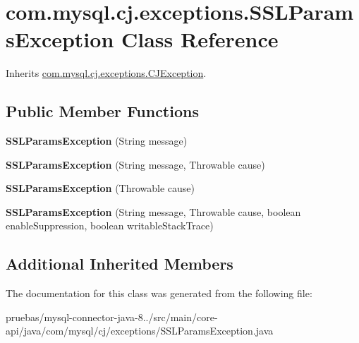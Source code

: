 \hypertarget{classcom_1_1mysql_1_1cj_1_1exceptions_1_1_s_s_l_params_exception}{}\section{com.\+mysql.\+cj.\+exceptions.\+S\+S\+L\+Params\+Exception Class Reference}
\label{classcom_1_1mysql_1_1cj_1_1exceptions_1_1_s_s_l_params_exception}


Inherits \mbox{\hyperlink{classcom_1_1mysql_1_1cj_1_1exceptions_1_1_c_j_exception}{com.\+mysql.\+cj.\+exceptions.\+C\+J\+Exception}}.

\subsection*{Public Member Functions}
\begin{DoxyCompactItemize}
\item 
\mbox{\label{classcom_1_1mysql_1_1cj_1_1exceptions_1_1_s_s_l_params_exception_a752de2699be84a20ae7aa974f57611b7}} 
{\bfseries S\+S\+L\+Params\+Exception} (String message)
\item 
\mbox{\label{classcom_1_1mysql_1_1cj_1_1exceptions_1_1_s_s_l_params_exception_aa0c6ca68d7e7fd39b7c4d849550d70b5}} 
{\bfseries S\+S\+L\+Params\+Exception} (String message, Throwable cause)
\item 
\mbox{\label{classcom_1_1mysql_1_1cj_1_1exceptions_1_1_s_s_l_params_exception_a5ae440bf6edff626b09447c640137a2a}} 
{\bfseries S\+S\+L\+Params\+Exception} (Throwable cause)
\item 
\mbox{\label{classcom_1_1mysql_1_1cj_1_1exceptions_1_1_s_s_l_params_exception_ae970e7affea01534eaa4e74e94f59a3b}} 
{\bfseries S\+S\+L\+Params\+Exception} (String message, Throwable cause, boolean enable\+Suppression, boolean writable\+Stack\+Trace)
\end{DoxyCompactItemize}
\subsection*{Additional Inherited Members}


The documentation for this class was generated from the following file\+:\begin{DoxyCompactItemize}
\item 
pruebas/mysql-\/connector-\/java-\/8../src/main/core-\/api/java/com/mysql/cj/exceptions/S\+S\+L\+Params\+Exception.\+java\end{DoxyCompactItemize}

